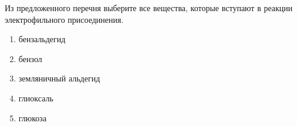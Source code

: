 Из предложенного перечня выберите все вещества, которые вступают в реакции электрофильного присоединения.

\begin{enumerate}
    \item бензальдегид
    \item бензол
    \item земляничный альдегид
    \item глиоксаль
    \item глюкоза
\end{enumerate}
